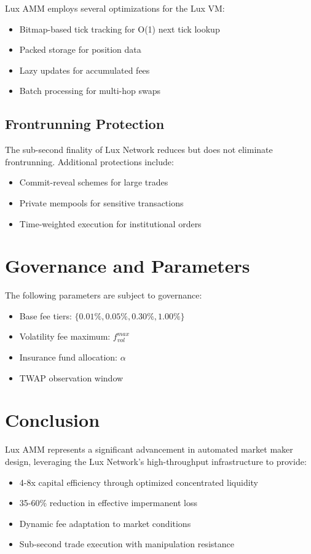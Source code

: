\documentclass[11pt,a4paper]{article}
\begin{document}
Lux AMM employs several optimizations for the Lux VM:
\begin{itemize}
    \item Bitmap-based tick tracking for O(1) next tick lookup
    \item Packed storage for position data
    \item Lazy updates for accumulated fees
    \item Batch processing for multi-hop swaps
\end{itemize}

\subsection{Frontrunning Protection}

The sub-second finality of Lux Network reduces but does not eliminate frontrunning. Additional protections include:
\begin{itemize}
    \item Commit-reveal schemes for large trades
    \item Private mempools for sensitive transactions
    \item Time-weighted execution for institutional orders
\end{itemize}

\section{Governance and Parameters}

The following parameters are subject to governance:
\begin{itemize}
    \item Base fee tiers: $\{0.01\%, 0.05\%, 0.30\%, 1.00\%\}$
    \item Volatility fee maximum: $f_{vol}^{max}$
    \item Insurance fund allocation: $\alpha$
    \item TWAP observation window
\end{itemize}

\section{Conclusion}

Lux AMM represents a significant advancement in automated market maker design, leveraging the Lux Network's high-throughput infrastructure to provide:
\begin{itemize}
    \item 4-8x capital efficiency through optimized concentrated liquidity
    \item 35-60\% reduction in effective impermanent loss
    \item Dynamic fee adaptation to market conditions
    \item Sub-second trade execution with manipulation resistance
\end{itemize}
\end{document}
